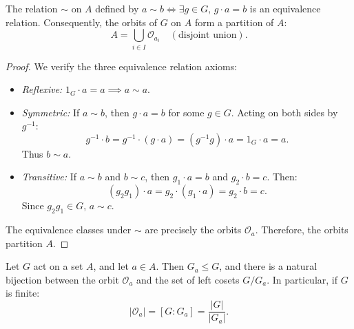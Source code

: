 \begin{proposition}
\label{prop:orbits_partition}
The relation $\sim$ on $A$ defined by $a \sim b \iff \exists g \in G, \, g \cdot a = b$ is an equivalence relation. Consequently, the orbits of $G$ on $A$ form a partition of $A$:
\begin{equation}
A = \bigcup_{i \in I} \mathcal{O}_{a_i} \quad (\text{disjoint union}).
\end{equation}
\end{proposition}

\begin{proof}
We verify the three equivalence relation axioms:
\begin{itemize}[leftmargin=1.5em, itemsep=4pt]
    \item \emph{Reflexive:} $1_G \cdot a = a \implies a \sim a$.
    \item \emph{Symmetric:} If $a \sim b$, then $g \cdot a = b$ for some $g \in G$.
    Acting on both sides by $g^{-1}$:
    \begin{equation*}
    g^{-1} \cdot b = g^{-1} \cdot (g \cdot a) = (g^{-1} g) \cdot a = 1_G \cdot a = a.
    \end{equation*}
    Thus $b \sim a$.
    \item \emph{Transitive:} If $a \sim b$ and $b \sim c$, then $g_1 \cdot a = b$ and $g_2 \cdot b = c$.
    Then:
    \begin{equation*}
    (g_2 g_1) \cdot a = g_2 \cdot (g_1 \cdot a) = g_2 \cdot b = c.
    \end{equation*}
    Since $g_2 g_1 \in G$, $a \sim c$.
\end{itemize}
The equivalence classes under $\sim$ are precisely the orbits $\mathcal{O}_a$. Therefore, the orbits partition $A$.
\end{proof}

\begin{theorem}
\label{thm:orbit_stabilizer}
Let $G$ act on a set $A$, and let $a \in A$. Then $G_a \le G$, and there is a natural bijection between the orbit $\mathcal{O}_a$ and the set of left cosets $G/G_a$. In particular, if $G$ is finite:
\begin{equation}
|\mathcal{O}_a| = [G : G_a] = \frac{|G|}{|G_a|}.
\end{equation}
\end{theorem}

